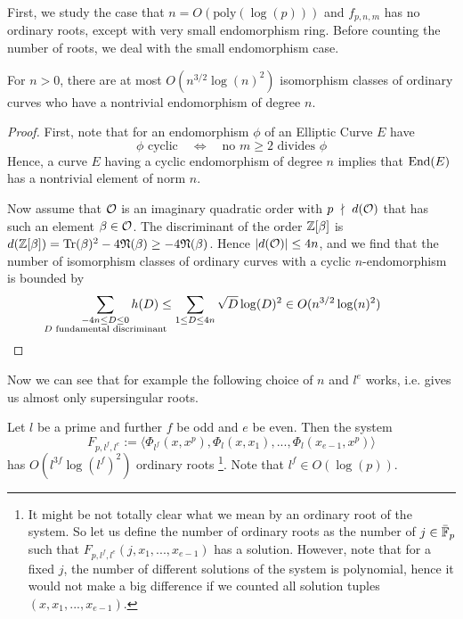 First, we study the case that $n = O(\mathrm{poly}(\log(p)))$ and $f_{p, n, m}$ has no ordinary roots, except with very small endomorphism ring.
Before counting the number of roots, we deal with the small endomorphism case.
\begin{prop}
    \label{prop:small_endomorphism_rare}
    For $n > 0$, there are at most $O(n^{3/2}\log(n)^2)$ isomorphism classes of ordinary curves who have a nontrivial endomorphism of degree $n$.
\end{prop}
\begin{proof}
    First, note that for an endomorphism $\phi$ of an Elliptic Curve $E$ have
    \begin{equation*}
        \text{$\phi$ cyclic} \quad \Leftrightarrow \quad \text{no $m \geq 2$ divides $\phi$}
    \end{equation*}
    Hence, a curve $E$ having a cyclic endomorphism of degree $n$ implies that $\mathrm{End}(E)$ has a nontrivial element of norm $n$.

    Now assume that $\mathcal{O}$ is an imaginary quadratic order with $p \ \nmid \  d(\mathcal{O})$ that has such an element $\beta \in \mathcal{O}$.
    The discriminant of the order $\mathbb{Z}[\beta]$ is $d(\mathbb{Z}[\beta]) = \mathrm{Tr}(\beta)^2 - 4\mathfrak{N}(\beta) \geq -4\mathfrak{N}(\beta)$.
    Hence $|d(\mathcal{O})| \leq 4n$, and we find that the number of isomorphism classes of ordinary curves with a cyclic $n$-endomorphism is bounded by
    \begin{align*}
        \sum_{\substack{-4n \leq D \leq 0\\\mathclap{\text{$D$ fundamental discriminant}}}} h(D) \leq \sum_{1 \leq D \leq 4n} \sqrt{D}\log(D)^2 \in O(n^{3/2}\log(n)^2) \qedhere
    \end{align*}
\end{proof}
Now we can see that for example the following choice of $n$ and $l^e$ works, i.e. gives us almost only supersingular roots.
\begin{prop}
    Let $l$ be a prime and further $f$ be odd and $e$ be even.
    Then the system
    \begin{equation*}
        F_{p, l^f, l^e} := \langle \Phi_{l^f}(x, x^p), \Phi_l(x, x_1), ..., \Phi_l(x_{e - 1}, x^p) \rangle
    \end{equation*}
    has $O(l^{3f}\log(l^f)^2)$ ordinary roots
    \footnote{It might be not totally clear what we mean by an ordinary root of the system.
    So let us define the number of ordinary roots as the number of $j \in \bar{\mathbb{F}}_p$ such that $F_{p, l^f, l^e}(j, x_1, ..., x_{e - 1})$ has a solution.
    However, note that for a fixed $j$, the number of different solutions of the system is polynomial, hence it would not make a big difference if we counted all solution tuples $(x, x_1, ..., x_{e - 1})$.}.
    Note that $l^f \in O(\log(p))$.
\end{prop}
